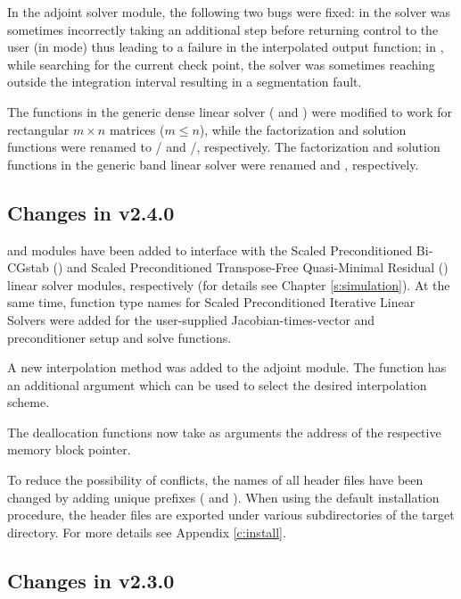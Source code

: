 In the adjoint solver module, the following two bugs were fixed: in 
the solver was sometimes incorrectly taking an additional step before
returning control to the user (in  mode) thus leading to
a failure in the interpolated output function; in , while searching
for the current check point, the solver was sometimes reaching outside the
integration interval resulting in a segmentation fault.

The functions in the generic dense linear solver ( and
) were modified to work for rectangular $m \times n$
matrices ($m \le n$), while the factorization and solution functions were
renamed to / and /,
respectively.
The factorization and solution functions in the generic band linear solver were
renamed  and , respectively.

\subsection*{Changes in v2.4.0}

{\cvspbcg} and {\cvsptfqmr} modules have been added to interface with the
Scaled Preconditioned Bi-CGstab ({\spbcg}) and Scaled Preconditioned
Transpose-Free Quasi-Minimal Residual ({\sptfqmr}) linear solver modules,
respectively (for details see Chapter \ref{s:simulation}).
At the same time, function type names for Scaled Preconditioned Iterative
Linear Solvers were added for the user-supplied Jacobian-times-vector and
preconditioner setup and solve functions.

A new interpolation method was added to the {\cvodes} adjoint module. The
function  has an additional argument which can be used to select
the desired interpolation scheme.

The deallocation functions now take as arguments the address of the respective
memory block pointer.

To reduce the possibility of conflicts, the names of all header files have
been changed by adding unique prefixes ( and ).
When using the default installation procedure, the header files are exported
under various subdirectories of the target  directory. For more
details see Appendix \ref{c:install}.

\subsection*{Changes in v2.3.0}


